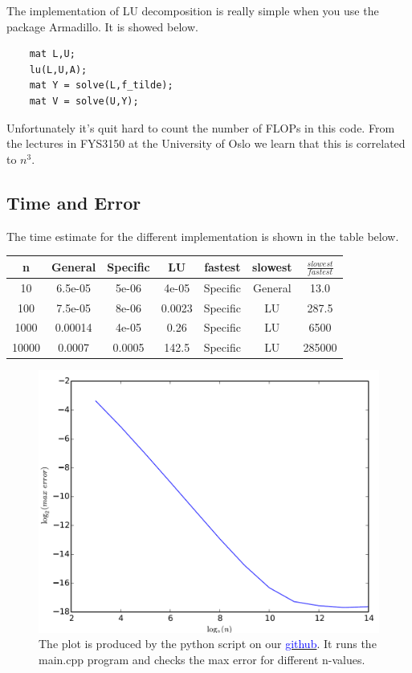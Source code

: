\documentclass[12pt,norsk,a4paper]{article}
\begin{document}
The implementation of LU decomposition is really simple when you use the package Armadillo. It is showed below.
\begin{lstlisting}
    mat L,U;
    lu(L,U,A);
    mat Y = solve(L,f_tilde);
    mat V = solve(U,Y);
\end{lstlisting}

Unfortunately it's quit hard to count the number of FLOPs in this code. From the lectures in FYS3150 at the University of Oslo we learn that this is correlated to $n^3$.

\subsection{Time and Error}

The time estimate for the different implementation is shown in the table below. 

	\begin{tabular}{|c|c|c|c|c|c|c|}
		\hline 
		n & General & Specific & LU & fastest & slowest & $\frac{slowest}{fastest}$\\ 
		\hline
		10 & 6.5e-05 & 5e-06 & 4e-05 & Specific & General & 13.0\\ 
		\hline 
		100 & 7.5e-05 & 8e-06 & 0.0023 & Specific & LU & 287.5\\ 
		\hline 
		1000 & 0.00014 & 4e-05 & 0.26 & Specific & LU & 6500\\ 
		\hline
		10000 & 0.0007 & 0.0005 & 142.5 & Specific & LU & 285000 \\ 
		\hline
	\end{tabular}


	\begin{figure}[H]
		\centering
		\includegraphics[width=0.5\linewidth]{bilder/error}
		\caption{The plot is produced by the python script on our \href{https://github.com/erikfsk/Project-1}{\textcolor{blue}{github}}. It runs the main.cpp program and checks the max error for different n-values.}
		\label{fig:error}
	\end{figure}
\end{document}
